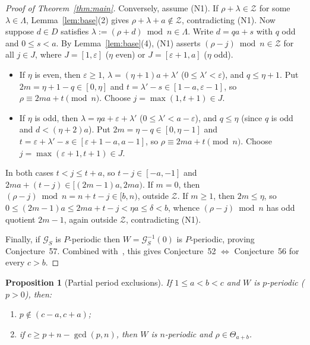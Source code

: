\documentclass[11pt]{article}
\newtheorem{proposition}[theorem]{Proposition}
\theoremstyle{remark}
\begin{document}
\begin{proof}[Proof of Theorem~\ref{thm:main}]
Conversely, assume \textup{(N1)}. If $\rho + \lambda \in \mathcal{Z}$ for some $\lambda \in \Lambda$, Lemma~\ref{lem:base}(2) gives $\rho + \lambda + a \notin \mathcal{Z}$, contradicting \textup{(N1)}. Now suppose $d \in D$ satisfies $\lambda := (\rho + d) \bmod n \in \Lambda$. Write $d = q a + s$ with $q$ odd and $0 \le s < a$. By Lemma~\ref{lem:base}(4), \textup{(N1)} asserts $(\rho - j) \bmod n \in \mathcal{Z}$ for all $j \in J$, where $J = [1, \varepsilon]$ ($\eta$ even) or $J = [\varepsilon + 1, a]$ ($\eta$ odd).
\begin{itemize}
\item If $\eta$ is even, then $\varepsilon \ge 1$, $\lambda = (\eta + 1)a + \lambda'$ ($0 \le \lambda' < \varepsilon$), and $q \le \eta + 1$. Put $2m = \eta + 1 - q \in [0, \eta]$ and $t = \lambda' - s \in [1 - a, \varepsilon - 1]$, so $\rho \equiv 2ma + t \pmod{n}$. Choose $j = \max(1, t + 1) \in J$.
\item If $\eta$ is odd, then $\lambda = \eta a + \varepsilon + \lambda'$ ($0 \le \lambda' < a - \varepsilon$), and $q \le \eta$ (since $q$ is odd and $d < (\eta + 2)a$). Put $2m = \eta - q \in [0, \eta - 1]$ and $t = \varepsilon + \lambda' - s \in [\varepsilon + 1 - a, a - 1]$, so $\rho \equiv 2ma + t \pmod{n}$. Choose $j = \max(\varepsilon + 1, t + 1) \in J$.
\end{itemize}
In both cases $t < j \le t + a$, so $t - j \in [-a, -1]$ and $2ma + (t - j) \in [(2m - 1)a, 2ma)$. If $m = 0$, then $(\rho - j) \bmod n = n + t - j \in [b, n)$, outside $\mathcal{Z}$. If $m \ge 1$, then $2m \le \eta$, so $0 \le (2m - 1)a \le 2ma + t - j < \eta a \le \delta < b$, whence $(\rho - j) \bmod n$ has odd quotient $2m - 1$, again outside $\mathcal{Z}$, contradicting \textup{(N1)}.

Finally, if $\mathcal{G}_S$ is $P$-periodic then $W = \mathcal{G}_S^{-1}(0)$ is $P$-periodic, proving Conjecture~57. Combined with~\cite[Theorem~34]{Manabe2026}, this gives Conjecture~52 $\iff$ Conjecture~56 for every $c > b$.
\end{proof}

\begin{proposition}[Partial period exclusions]\label{prop:partial}
If $1 \le a < b < c$ and $W$ is $p$-periodic ($p > 0$), then:
\begin{enumerate}
\item $p \notin (c - a, c + a)$;
\item if $c \ge p + n - \gcd(p, n)$, then $W$ is $n$-periodic and $\rho \in \Theta_{a+b}$.
\end{enumerate}
\end{proposition}
\end{document}
